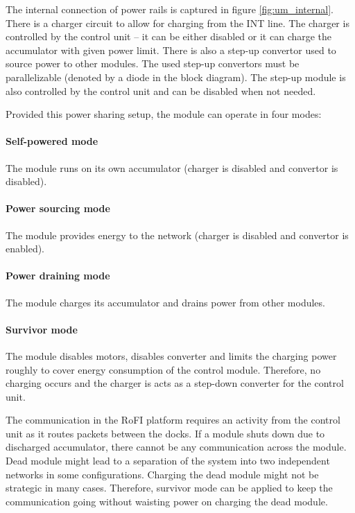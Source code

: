 The internal connection of power rails is captured in figure
\ref{fig:um_internal}. There is a charger circuit to allow for charging from the
INT line. The charger is controlled by the control unit -- it can be either
disabled or it can charge the accumulator with given power limit. There is also
a step-up convertor used to source power to other modules. The used step-up
convertors must be parallelizable (denoted by a diode in the block diagram). The
step-up module is also controlled by the control unit and can be disabled when
not needed.

Provided this power sharing setup, the module can operate in four modes:

\paragraph{Self-powered mode} The module runs on its own accumulator (charger is
disabled and convertor is disabled).

\paragraph{Power sourcing mode} The module provides energy to the network
(charger is disabled and convertor is enabled).

\paragraph{Power draining mode} The module charges its accumulator and drains
power from other modules.

\paragraph{Survivor mode} The module disables motors, disables converter and
limits the charging power roughly to cover energy consumption of the control
module. Therefore, no charging occurs and the charger is acts as a step-down
converter for the control unit.

The communication in the RoFI platform requires an activity from the control
unit as it routes packets between the docks. If a module shuts down due to
discharged accumulator, there cannot be any communication across the module.
Dead module might lead to a separation of the system into two independent
networks in some configurations. Charging the dead module might not be strategic
in many cases. Therefore, survivor mode can be applied to keep the communication
going without waisting power on charging the dead module.
